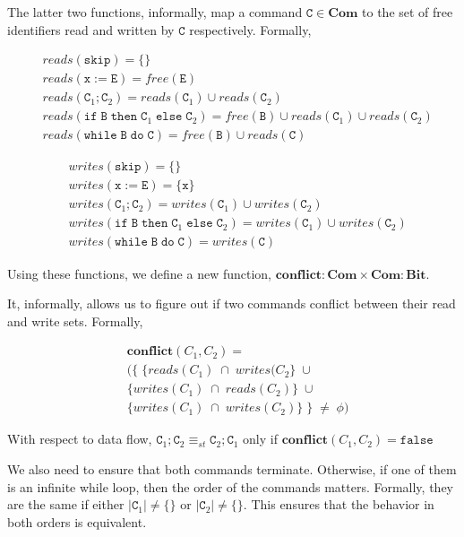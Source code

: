 \documentclass[a4paper,10pt]{article}
\newcommand{\E}{\mathtt{E}}
\newcommand{\B}{\mathtt{B}}
\newcommand{\C}{\mathtt{C}}
\newcommand{\false}{\mathtt{false}}
\newcommand{\ifsym}{\mathtt{if}}
\newcommand{\then}{\mathtt{then}}
\newcommand{\elsesym}{\mathtt{else}}
\newcommand{\whilesym}{\mathtt{while}}
\newcommand{\dosym}{\mathtt{do}}
\newcommand{\skipsym}{\mathtt{skip}}
\begin{document}
\begin{enumerate}
The latter two functions, informally, map a command $\C \in \textbf{Com}$ to the
set of free identifiers read and written by $\C$ respectively. Formally,

\begin{align*}
& reads(\skipsym) = \{\} \\
& reads(\mathtt{x} := \E) = free(\E) \\
& reads(\C_{1}; \C_{2}) = reads(\C_{1}) \cup reads(\C_{2}) \\
& reads(\ifsym \; \B \; \then \; \C_{1} \; \elsesym \; \C_{2}) = free(\B) \cup
reads(\C_{1}) \cup reads(\C_{2}) \\
& reads(\whilesym \; \B \; \dosym \; \C) = free(\B) \cup reads(\C)
\end{align*}

\begin{align*}
& writes(\skipsym) = \{\} \\
& writes(\mathtt{x} := \E) = \{\mathtt{x}\} \\
& writes(\C_{1}; \C_{2}) = writes(\C_{1}) \cup writes(\C_{2}) \\
& writes(\ifsym \; \B \; \then \; \C_{1} \; \elsesym \; \C_{2}) = 
writes(\C_{1}) \cup writes(\C_{2}) \\
& writes(\whilesym \; \B \; \dosym \; \C) = writes(\C)
\end{align*}  
  
Using these functions, we define a new function,  
$\textbf{conflict} : \textbf{Com} \times \textbf{Com} : \textbf{Bit}$.

It, informally, allows us to figure out if two commands conflict between their
read and write sets. Formally,
 
\begin{align*}
& \textbf{conflict}(C_{1}, C_{2}) = \\
& ( \{ \; \{ reads(C_{1}) \; \cap \; writes(C_{2} \} \; \cup \; \\
& \{ writes(C_{1}) \; \cap \; reads(C_{2}) \} \; \cup \; \\
& \{ writes(C_{1}) \; \cap \; writes(C_{2})\} \; \} \; \neq \; \phi)
\end{align*}  
  
With respect to data flow, $\C_1 ; \C_2 \equiv_{st} \C_2 ; \C_1$
only if $ \textbf{conflict}(C_{1}, C_{2}) = \false $

We also need to ensure that both commands terminate. Otherwise, if 
one of them is an infinite while loop, then the order of the commands
matters. Formally, they are the same if either $|\C_1| \neq \{\} $ or  
$|\C_2| \neq \{\} $. 
This ensures that the behavior in both orders is equivalent.



\end{enumerate}
\end{document}
